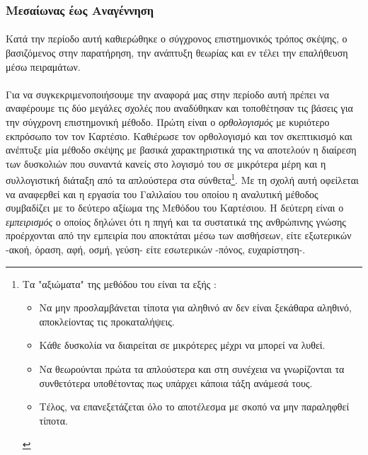 \documentclass[a4paper,12pt,twoside]{report}
\begin{document}
		\subsubsection{Μεσαίωνας έως Αναγέννηση}	
			\paragraph{}{Κατά την περίοδο αυτή καθιερώθηκε ο σύγχρονος επιστημονικός τρόπος σκέψης, ο βασιζόμενος στην παρατήρηση, την ανάπτυξη θεωρίας και εν τέλει την επαλήθευση μέσω πειραμάτων.
			
			\paragraph{}{Για να συγκεκριμενοποιήσουμε την αναφορά μας στην περίοδο αυτή πρέπει να αναφέρουμε τις δύο μεγάλες σχολές που αναδύθηκαν και τοποθέτησαν τις βάσεις για την σύγχρονη επιστημονική μέθοδο. Πρώτη είναι ο \textit{ορθολογισμός} με κυριότερο εκπρόσωπο τον τον Καρτέσιο. Καθιέρωσε τον ορθολογισμό και τον σκεπτικισμό και ανέπτυξε μία μέθοδο σκέψης \cite{DiscourseΟnMethod:Descartes} με βασικά χαρακτηριστικά της να αποτελούν η διαίρεση των δυσκολιών που συναντά κανείς στο λογισμό του σε μικρότερα μέρη και η συλλογιστική διάταξη από τα απλούστερα στα σύνθετα\footnote{Τα "αξιώματα" της μεθόδου του είναι τα εξής \cite{ΛόγοςΠερίΤηςΜεθόδουDescartes1976} : \begin{itemize} \item Να μην προσλαμβάνεται τίποτα για αληθινό αν δεν είναι ξεκάθαρα αληθινό, αποκλείοντας τις προκαταλήψεις. \item Κάθε δυσκολία να διαιρείται σε μικρότερες μέχρι να μπορεί να λυθεί. \item Να θεωρούνται πρώτα τα απλούστερα και στη συνέχεια να γνωρίζονται τα συνθετότερα υποθέτοντας πως υπάρχει κάποια τάξη ανάμεσά τους. \item Τέλος, να επανεξετάζεται όλο το αποτέλεσμα με σκοπό να μην παραληφθεί τίποτα.\end{itemize}}. Με τη σχολή αυτή οφείλεται να αναφερθεί και η εργασία του Γαλιλαίου του οποίου η αναλυτική μέθοδος συμβαδίζει με το δεύτερο αξίωμα της Μεθόδου του Καρτέσιου. Η δεύτερη είναι ο \textit{εμπειρισμός} ο οποίος δηλώνει ότι η πηγή και τα συστατικά της ανθρώπινης γνώσης προέρχονται από την εμπειρία που αποκτάται μέσω των αισθήσεων, είτε εξωτερικών -ακοή, όραση, αφή, οσμή, γεύση- είτε εσωτερικών -πόνος, ευχαρίστηση-.
			}
			
}
\end{document}
